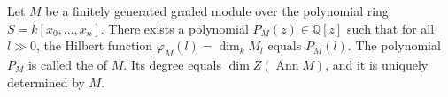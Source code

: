 Let $M$ be a finitely generated graded module over the polynomial ring $S = k[x_0, \ldots, x_n]$. There exists a polynomial $P_M(z) \in \mathbb{Q}[z]$ such that for all $l \gg 0$, the Hilbert function $\varphi_M(l) = \dim_k M_l$ equals $P_M(l)$. The polynomial $P_M$ is called the  of $M$. Its degree equals $\dim Z(\operatorname{Ann} M)$, and it is uniquely determined by $M$.
